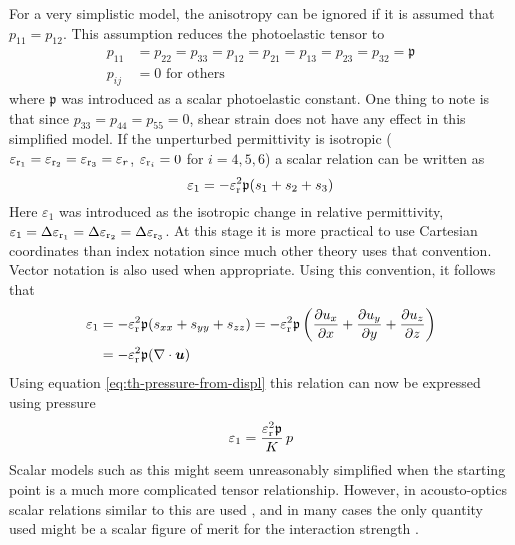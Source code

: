 \documentclass[11pt,twoside]{eitExjobb}
\begin{document}
	For a very simplistic model, the anisotropy can be ignored if it is assumed that $p_{11} = p_{12}$. This assumption reduces the photoelastic tensor to
	\begin{equation*}
	\begin{split}
		p_{11} &= p_{22} = p_{33} = p_{12} = p_{21} = p_{13} = p_{23} = p_{32} = \mathfrak{p}\\
		p_{ij} &= 0 \text{ for others}
	\end{split}
	\end{equation*}
	where $\mathfrak{p}$ was introduced as a scalar photoelastic constant. One thing to note is that since $p_{33} = p_{44} = p_{55} = 0$, shear strain does not have any effect in this simplified model. If the unperturbed permittivity is isotropic ($\varepsilon_{\mathrm{r}_1} = \varepsilon_{\mathrm{r}_2} = \varepsilon_{\mathrm{r}_3} = \varepsilon_r$, $\varepsilon_{\mathrm{r}_i} = 0$ for $i=4,5,6$) a scalar relation can be written as
	\begin{equation*}
		\varepsilon_1 = -\varepsilon_{\mathrm{r}}^2 \mathfrak{p} (s_1 + s_2 + s_3)
	\end{equation*}
	Here $\varepsilon_1$ was introduced as the isotropic change in relative permittivity, $\varepsilon_1 = \Delta \varepsilon_{\mathrm{r}_1} = \Delta \varepsilon_{\mathrm{r}_2} = \Delta \varepsilon_{\mathrm{r}_3}$. At this stage it is more practical to use Cartesian coordinates than index notation since much other theory uses that convention. Vector notation is also used when appropriate. Using this convention, it follows that
	\begin{equation}
	\begin{split}
		\varepsilon_1 &= -\varepsilon_{\mathrm{r}}^2 \mathfrak{p} (s_{xx} + s_{yy} + s_{zz}) = -\varepsilon_{\mathrm{r}}^2 \mathfrak{p} \left( \frac{\partial u_x}{\partial x} + \frac{\partial u_y}{\partial y} + \frac{\partial u_z}{\partial z} \right) \\
		&= -\varepsilon_{\mathrm{r}}^2 \mathfrak{p} (\nabla \cdot \bm{u})
	\end{split}
	\label{eq:th-PE-scalar}
	\end{equation}
	Using equation \eqref{eq:th-pressure-from-displ} this relation can now be expressed using pressure
	\begin{equation}
		\varepsilon_1 = \frac{\varepsilon_{\mathrm{r}}^2 \mathfrak{p}}{K} \,p
		\label{eq:th-PE-scalar-p}
	\end{equation}
	Scalar models such as this might seem unreasonably simplified when the starting point is a much more complicated tensor relationship. However, in acousto-optics scalar relations similar to this are used  \cite{Saleh2007} \cite{Korpel1988}, and in many cases the only quantity used might be a scalar figure of merit for the interaction strength \cite{Korpel1988}.
	
\end{document}
